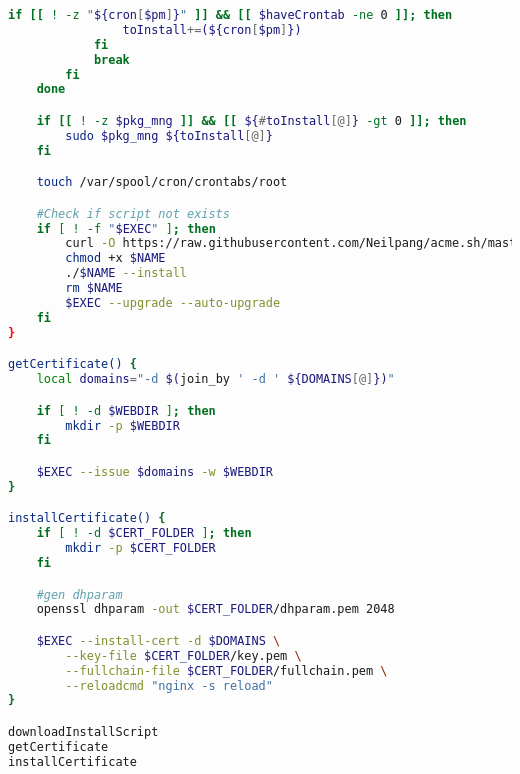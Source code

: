 \begin{lstlisting}[language=bash, caption=\textit{Script} de instalação do \texttt{acme.sh}]
            if [[ ! -z "${cron[$pm]}" ]] && [[ $haveCrontab -ne 0 ]]; then
                toInstall+=(${cron[$pm]})
            fi
            break
        fi
    done

    if [[ ! -z $pkg_mng ]] && [[ ${#toInstall[@]} -gt 0 ]]; then
        sudo $pkg_mng ${toInstall[@]}
    fi

    touch /var/spool/cron/crontabs/root

    #Check if script not exists
    if [ ! -f "$EXEC" ]; then
        curl -O https://raw.githubusercontent.com/Neilpang/acme.sh/master/acme.sh
        chmod +x $NAME
        ./$NAME --install
        rm $NAME
        $EXEC --upgrade --auto-upgrade
    fi
}

getCertificate() {
    local domains="-d $(join_by ' -d ' ${DOMAINS[@]})"

    if [ ! -d $WEBDIR ]; then
        mkdir -p $WEBDIR
    fi

    $EXEC --issue $domains -w $WEBDIR
}

installCertificate() {
    if [ ! -d $CERT_FOLDER ]; then
        mkdir -p $CERT_FOLDER
    fi

    #gen dhparam
    openssl dhparam -out $CERT_FOLDER/dhparam.pem 2048

    $EXEC --install-cert -d $DOMAINS \
        --key-file $CERT_FOLDER/key.pem \
        --fullchain-file $CERT_FOLDER/fullchain.pem \
        --reloadcmd "nginx -s reload"
}

downloadInstallScript
getCertificate
installCertificate
\end{lstlisting}


